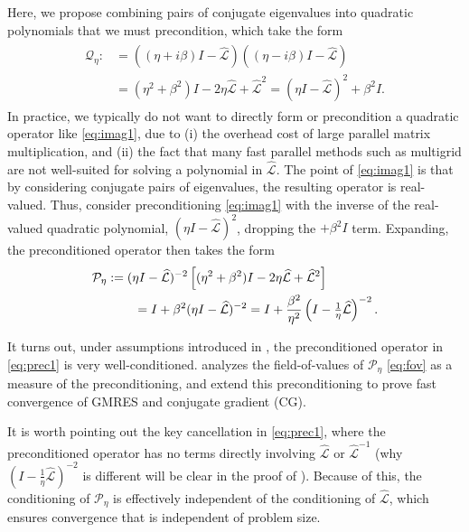 \documentclass[review]{siamart}
\begin{document}
Here, we propose combining pairs of conjugate eigenvalues into quadratic polynomials
that we must precondition, which take the form 
%
\begin{align}\label{eq:imag1}
\begin{split}
\mathcal{Q}_\eta :&= ((\eta + i\beta)I - \widehat{\mathcal{L}})((\eta - i\beta)I - \widehat{\mathcal{L}}) \\
& = (\eta^2+\beta^2)I - 2\eta \widehat{\mathcal{L}} + \widehat{\mathcal{L}}^2 
= (\eta I - \widehat{\mathcal{L}})^2 + \beta^2I. 
\end{split}
\end{align}
%
In practice, we typically do not want to directly form or precondition a quadratic
operator like \eqref{eq:imag1}, due to (i) the overhead cost of large parallel matrix
multiplication, and (ii) the fact that many fast parallel methods such as multigrid are not well-suited for solving a polynomial in $\widehat{\mathcal{L}}$. The point of \eqref{eq:imag1}
is that by considering conjugate pairs of eigenvalues, the resulting operator is real-valued.
Thus, consider preconditioning \eqref{eq:imag1} with the inverse of the real-valued quadratic
polynomial, $(\eta I - \widehat{\mathcal{L}})^2$, dropping the $+ \beta^2 I$ term. Expanding,
the preconditioned operator then takes the form
%
\begin{align}\nonumber
\mathcal{P}_\eta & := (\eta I - \widehat{\mathcal{L}})^{-2}\left[(\eta^2+\beta^2)I - 2\eta \widehat{\mathcal{L}} + \widehat{\mathcal{L}}^2\right] \\
&\hspace{5ex} = I + \beta^2(\eta I - \widehat{\mathcal{L}})^{-2}
= I + \frac{\beta^2}{\eta^2}\left(I - \tfrac{1}{\eta}\widehat{\mathcal{L}}\right)^{-2}.\label{eq:prec1}
\end{align}
%

It turns out, under assumptions introduced in , the preconditioned 
operator in \eqref{eq:prec1} is very well-conditioned.  analyzes the
field-of-values of $\mathcal{P}_\eta$ \eqref{eq:fov}
as a measure of the preconditioning, and  extend this 
preconditioning to prove fast convergence of GMRES and conjugate gradient (CG).

%
\begin{remark}
It is worth pointing out the key
cancellation in \eqref{eq:prec1}, where the preconditioned operator has no terms directly
involving $\widehat{\mathcal{L}}$ or $\widehat{\mathcal{L}}^{-1}$ (why $(I -
\tfrac{1}{\eta}\widehat{\mathcal{L}})^{-2}$ is different will be clear in the proof
of ). Because of this, the conditioning of $\mathcal{P}_\eta$ is effectively
independent of the conditioning of $\widehat{\mathcal{L}}$, which ensures convergence
that is independent of problem size.
\end{remark}
%
\end{document}
